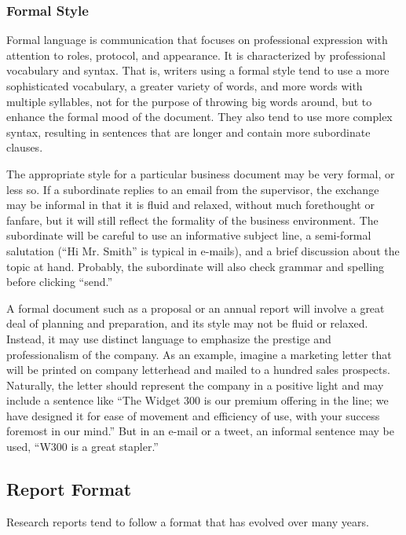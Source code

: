 \subsubsection{Formal Style}

Formal language is communication that focuses on professional expression with attention to roles, protocol, and appearance. It is characterized by professional vocabulary and syntax. That is, writers using a formal style tend to use a more sophisticated vocabulary, a greater variety of words, and more words with multiple syllables, not for the purpose of throwing big words around, but to enhance the formal mood of the document. They also tend to use more complex syntax, resulting in sentences that are longer and contain more subordinate clauses.

The appropriate style for a particular business document may be very formal, or less so. If a subordinate replies to an email from the supervisor, the exchange may be informal in that it is fluid and relaxed, without much forethought or fanfare, but it will still reflect the formality of the business environment. The subordinate will be careful to use an informative subject line, a semi-formal salutation (``Hi Mr. Smith'' is typical in e-mails), and a brief discussion about the topic at hand. Probably, the subordinate will also check grammar and spelling before clicking ``send.''

A formal document such as a proposal or an annual report will involve a great deal of planning and preparation, and its style may not be fluid or relaxed. Instead, it may use distinct language to emphasize the prestige and professionalism of the company. As an example, imagine a marketing letter that will be printed on company letterhead and mailed to a hundred sales prospects. Naturally, the letter should represent the company in a positive light and may include a sentence like ``The Widget 300 is our premium offering in the line; we have designed it for ease of movement and efficiency of use, with your success foremost in our mind.'' But in an e-mail or a tweet, an informal sentence may be used, ``W300 is a great stapler.''

\subsection{Report Format}

Research reports tend to follow a format that has evolved over many years.

